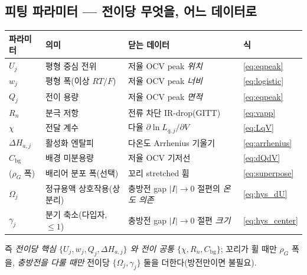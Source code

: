 \documentclass[11pt,a4paper]{article}
\newcommand{\bg}{\mathrm{bg}}
\begin{document}
\subsection{피팅 파라미터 — 전이당 무엇을, 어느 데이터로}
\begin{center}
\renewcommand{\arraystretch}{1.3}
\begin{tabular}{p{} p{} p{} p{}}
\toprule
파라미터 & 의미 & 닫는 데이터 & 식 \\
\midrule
$U_j$ & 평형 중심 전위 & 저율 OCV peak \emph{위치} & \eqref{eq:eqpeak} \\
$w_j$ & 평형 폭(이상 $RT/F$) & 저율 OCV peak \emph{너비} & \eqref{eq:logistic} \\
$Q_j$ & 전이 용량 & 저율 OCV peak \emph{면적} & \eqref{eq:eqpeak} \\
$R_n$ & 분극 저항 & 전류 차단 IR-drop(GITT) & \eqref{eq:vapp} \\
$\chi$ & 전달 계수 & 다율 $\partial\ln L_{q,j}/\partial V$ & \eqref{eq:LqV} \\
$\Delta H_{a,j}$ & 활성화 엔탈피 & 다온도 Arrhenius 기울기 & \eqref{eq:arrhenius} \\
$C_\bg$ & 배경 미분용량 & 저율 OCV 기저선 & \eqref{eq:dQdV} \\
($\rho_G$ 폭) & 배리어 분포 폭(선택) & 꼬리 stretched 휨 & \eqref{eq:superpose} \\
$\Omega_j$ & 정규용액 상호작용(상분리) & 충방전 gap $|I|\!\to\!0$ 절편의 \emph{온도 의존} & \eqref{eq:hys_dU} \\
$\gamma_j$ & 분기 축소(다입자, $\le1$) & 충방전 gap $|I|\!\to\!0$ 절편 \emph{크기} & \eqref{eq:hys_center} \\
\bottomrule
\end{tabular}
\end{center}
즉 \emph{전이당 핵심 $\{U_j,w_j,Q_j,\Delta H_{a,j}\}$ 와 전이 공통 $\{\chi,R_n,C_\bg\}$}; 꼬리가 휠 때만 $\rho_G$ 폭을,
\emph{충방전을 다룰 때만} 전이당 $\{\Omega_j,\gamma_j\}$ 둘을 더한다(방전만이면 불필요).
\end{document}
